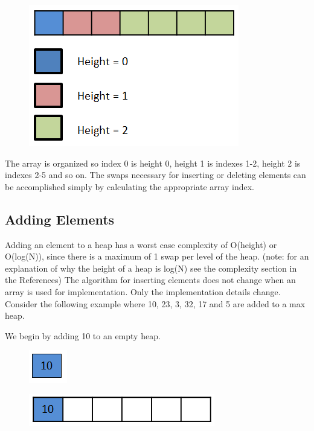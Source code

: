 \begin{figure}[H]
\centering
\includegraphics{pictures/heap0.png}
\label{fig:heap0}
\end{figure}

The array is organized so index 0 is height 0, height 1 is indexes 1-2, height 2 is indexes 2-5 and so on.   The swaps necessary for inserting or deleting elements can be accomplished simply by calculating the appropriate array index.

\subsection{Adding Elements}

Adding an element to a heap has a worst case complexity of O(height) or O(log(N)), since there is a maximum of 1 swap per level of the heap.  (note: for an explanation of why the height of a heap is log(N) see the complexity section in the References)
The algorithm for inserting elements does not change when an array is used for implementation.  Only the implementation details change.   Consider the following example where 10, 23, 3, 32, 17 and 5 are added to a max heap.

We begin by adding 10 to an empty heap.

\begin{figure}[H]
\centering
\includegraphics{pictures/heap1.png}
\label{fig:heap1}
\end{figure}

\begin{figure}[H]
\centering
\includegraphics{pictures/heap1a.png}
\label{fig:heap1a}
\end{figure}

